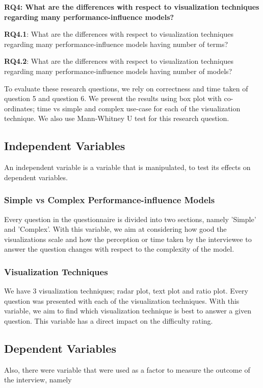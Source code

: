 \textbf{RQ4: What are the differences with respect to visualization techniques regarding many performance-influence models?}

\begin{myindentpar}{0.5cm}
\textbf{RQ4.1}: What are the differences with respect to visualization techniques regarding many performance-influence models having number of terms?

\textbf{RQ4.2}: What are the differences with respect to visualization techniques regarding many performance-influence models having number of models?

To evaluate these research questions, we rely on correctness and time taken of question 5 and question 6. We present the results using box plot with co-ordinates; time vs simple and complex use-case for each of the visualization technique. We also use Mann-Whitney U test for this research question.
\end{myindentpar}

\subsection{Independent Variables}
An independent variable is a variable that is manipulated, to test its effects on dependent variables.

\subsubsection*{Simple vs Complex Performance-influence Models}
Every question in the questionnaire is divided into two sections, namely 'Simple' and 'Complex'. With this variable, we aim at considering how good the visualizations scale and how the perception or time taken by the interviewee to answer the question changes with respect to the complexity of the model.

\subsubsection*{Visualization Techniques}
We have 3 visualization techniques; radar plot, text plot and ratio plot. Every question was presented with each of the visualization techniques. With this variable, we aim to find which visualization technique is best to answer a given question. This variable has a direct impact on the difficulty rating.

\subsection{Dependent Variables}
Also, there were variable that were used as a factor to measure the outcome of the interview, namely

